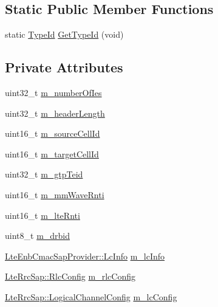 \subsection*{Static Public Member Functions}
\begin{DoxyCompactItemize}
\item 
static \hyperlink{classns3_1_1TypeId}{Type\+Id} \hyperlink{classns3_1_1EpcX2RlcSetupRequestHeader_acdd788911a4c787d3b9e832c34098bd8}{Get\+Type\+Id} (void)
\end{DoxyCompactItemize}
\subsection*{Private Attributes}
\begin{DoxyCompactItemize}
\item 
uint32\+\_\+t \hyperlink{classns3_1_1EpcX2RlcSetupRequestHeader_acc140dd4c48241219d61a983279fae0c}{m\+\_\+number\+Of\+Ies}
\item 
uint32\+\_\+t \hyperlink{classns3_1_1EpcX2RlcSetupRequestHeader_a8621ee1a16fc1946039d26fdbcbb5f12}{m\+\_\+header\+Length}
\item 
uint16\+\_\+t \hyperlink{classns3_1_1EpcX2RlcSetupRequestHeader_aa382eb05fd382b39d5e896e0d474b4c1}{m\+\_\+source\+Cell\+Id}
\item 
uint16\+\_\+t \hyperlink{classns3_1_1EpcX2RlcSetupRequestHeader_ab145b5aab23b77ae59c52feed51f006c}{m\+\_\+target\+Cell\+Id}
\item 
uint32\+\_\+t \hyperlink{classns3_1_1EpcX2RlcSetupRequestHeader_a7e3b220f0853fbf4542cb74c164e4e53}{m\+\_\+gtp\+Teid}
\item 
uint16\+\_\+t \hyperlink{classns3_1_1EpcX2RlcSetupRequestHeader_a79082f7d2c079d5f07a2eee04a2478df}{m\+\_\+mm\+Wave\+Rnti}
\item 
uint16\+\_\+t \hyperlink{classns3_1_1EpcX2RlcSetupRequestHeader_a3e69551771c7281ef6c352c6190d1718}{m\+\_\+lte\+Rnti}
\item 
uint8\+\_\+t \hyperlink{classns3_1_1EpcX2RlcSetupRequestHeader_a8319f64b745d6b66e7f898a182f77112}{m\+\_\+drbid}
\item 
\hyperlink{structns3_1_1LteEnbCmacSapProvider_1_1LcInfo}{Lte\+Enb\+Cmac\+Sap\+Provider\+::\+Lc\+Info} \hyperlink{classns3_1_1EpcX2RlcSetupRequestHeader_a737eacc0a9d3138b74e10147b97cb1b7}{m\+\_\+lc\+Info}
\item 
\hyperlink{structns3_1_1LteRrcSap_1_1RlcConfig}{Lte\+Rrc\+Sap\+::\+Rlc\+Config} \hyperlink{classns3_1_1EpcX2RlcSetupRequestHeader_a5597837237a68a466385d0c165115608}{m\+\_\+rlc\+Config}
\item 
\hyperlink{structns3_1_1LteRrcSap_1_1LogicalChannelConfig}{Lte\+Rrc\+Sap\+::\+Logical\+Channel\+Config} \hyperlink{classns3_1_1EpcX2RlcSetupRequestHeader_a2403ad34c9b5883f8239e999bc5eee76}{m\+\_\+lc\+Config}
\end{DoxyCompactItemize}
